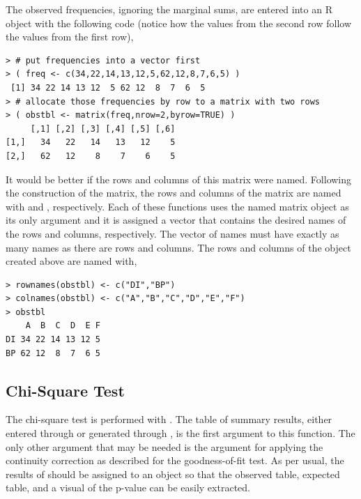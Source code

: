 \documentclass[10pt,openany]{book}\usepackage[]{graphicx}\usepackage[]{color}
\makeatletter
\newenvironment{kframe}{%
 \def\at@end@of@kframe{}%
 \ifinner\ifhmode%
  \def\at@end@of@kframe{\end{minipage}}%
  \begin{minipage}{\columnwidth}%
 \fi\fi%
 \def\FrameCommand##1{\hskip\@totalleftmargin \hskip-\fboxsep
 \colorbox{shadecolor}{##1}\hskip-\fboxsep
     \hskip-\linewidth \hskip-\@totalleftmargin \hskip\columnwidth}%
 \MakeFramed {\advance\hsize-\width
   \@totalleftmargin\z@ \linewidth\hsize
   \@setminipage}}%
 {\par\unskip\endMakeFramed%
 \at@end@of@kframe}
\newenvironment{knitrout}{}{} %
\makeatother
\begin{document}
The observed frequencies, ignoring the marginal sums, are entered into an R object with the following code (notice how the values from the second row follow the values from the first row),
\begin{knitrout}
\color{fgcolor}\begin{kframe}
\begin{verbatim}
> # put frequencies into a vector first
> ( freq <- c(34,22,14,13,12,5,62,12,8,7,6,5) )
 [1] 34 22 14 13 12  5 62 12  8  7  6  5
> # allocate those frequencies by row to a matrix with two rows
> ( obstbl <- matrix(freq,nrow=2,byrow=TRUE) )
     [,1] [,2] [,3] [,4] [,5] [,6]
[1,]   34   22   14   13   12    5
[2,]   62   12    8    7    6    5
\end{verbatim}
\end{kframe}
\end{knitrout}
It would be better if the rows and columns of this matrix were named.  Following the construction of the matrix, the rows and columns of the matrix are named with  and , respectively.  Each of these functions uses the named matrix object as its only argument and it is assigned a vector that contains the desired names of the rows and columns, respectively.  The vector of names must have exactly as many names as there are rows and columns.  The rows and columns of the  object created above are named with,
\begin{knitrout}
\color{fgcolor}\begin{kframe}
\begin{verbatim}
> rownames(obstbl) <- c("DI","BP")
> colnames(obstbl) <- c("A","B","C","D","E","F")
> obstbl
    A  B  C  D  E F
DI 34 22 14 13 12 5
BP 62 12  8  7  6 5
\end{verbatim}
\end{kframe}
\end{knitrout}

\subsection{Chi-Square Test}
The chi-square test is performed with .  The table of summary results, either entered through  or generated through , is the first argument to this function.  The only other argument that may be needed is the  argument for applying the continuity correction as described for the goodness-of-fit test.  As per usual, the results of  should be assigned to an object so that the observed table, expected table, and a visual of the p-value can be easily extracted.
\end{document}

